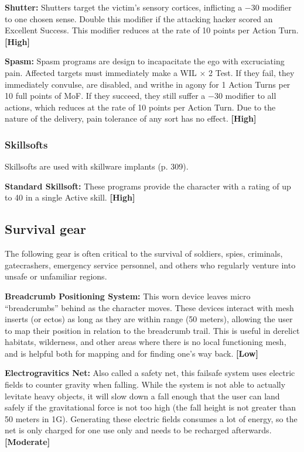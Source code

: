 \textbf{Shutter:} Shutters target the victim’s sensory cortices, inflicting a $-$30 modifier to one chosen sense. Double this modifier if the attacking hacker scored an Excellent Success. This modifier reduces at the rate of 10 points per Action Turn. \textbf{[High]}

\textbf{Spasm:} Spasm programs are design to incapacitate the ego with excruciating pain. Affected targets must immediately make a WIL $\times$ 2 Test. If they fail, they immediately convulse, are disabled, and writhe in agony for 1 Action Turns per 10 full points of MoF. If they succeed, they still suffer a $-$30 modifier to all actions, which reduces at the rate of 10 points per Action Turn. Due to the nature of the delivery, pain tolerance of any sort has no effect. \textbf{[High]}

\subsubsection{Skillsofts}

Skillsofts are used with skillware implants (p. 309).

\textbf{Standard Skillsoft:} These programs provide the character with a rating of up to 40 in a single Active skill. \textbf{[High]}

\subsection{Survival gear}
\label{sec:survival-gear}

The following gear is often critical to the survival of soldiers, spies, criminals, gatecrashers, emergency service personnel, and others who regularly venture into unsafe or unfamiliar regions.

\textbf{Breadcrumb Positioning System:} This worn device leaves micro ``breadcrumbs'' behind as the character moves. These devices interact with mesh inserts (or ectos) as long as they are within range (50 meters), allowing the user to map their position in relation to the breadcrumb trail. This is useful in derelict habitats, wilderness, and other areas where there is no local functioning mesh, and is helpful both for mapping and for finding one’s way back. \textbf{[Low]}

\textbf{Electrogravitics Net:} Also called a safety net, this failsafe system uses electric fields to counter gravity when falling. While the system is not able to actually levitate heavy objects, it will slow down a fall enough that the user can land safely if the gravitational force is not too high (the fall height is not greater than 50 meters in 1G). Generating these electric fields consumes a lot of energy, so the net is only charged for one use only and needs to be recharged afterwards. \textbf{[Moderate]}

